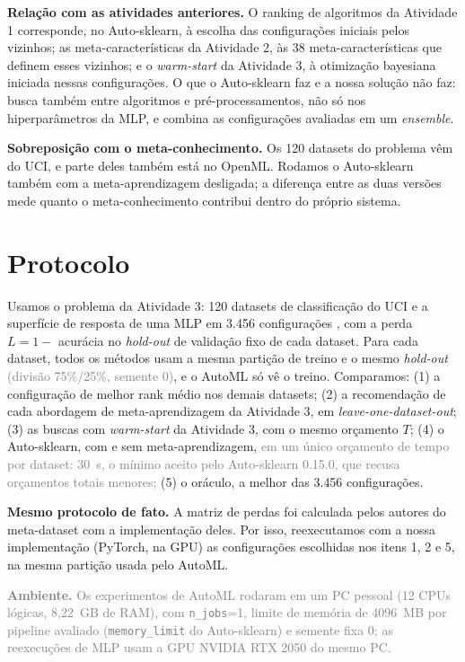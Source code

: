 \documentclass[10pt]{article}
\newcommand{\pend}[1]{}
\newcommand{\editinst}[1]{\textcolor{gray}{#1}}
\begin{document}
\textbf{Relação com as atividades anteriores.} O ranking de algoritmos da Atividade 1 corresponde, no Auto-sklearn, à escolha das configurações iniciais pelos vizinhos; as meta-características da Atividade 2, às 38 meta-características que definem esses vizinhos; e o \textit{warm-start} da Atividade 3, à otimização bayesiana iniciada nessas configurações. O que o Auto-sklearn faz e a nossa solução não faz: busca também entre algoritmos e pré-processamentos, não só nos hiperparâmetros da MLP, e combina as configurações avaliadas em um \textit{ensemble}.

\textbf{Sobreposição com o meta-conhecimento.} Os 120 datasets do problema vêm do UCI, e parte deles também está no OpenML. \pend{[Resultado do cruzamento entre os 120 datasets e os 208 da base do Auto-sklearn.]} Rodamos o Auto-sklearn também com a meta-aprendizagem desligada; a diferença entre as duas versões mede quanto o meta-conhecimento contribui dentro do próprio sistema.

\section{Protocolo}\label{sec:protocolo}

Usamos o problema da Atividade 3: 120 datasets de classificação do UCI e a superfície de resposta de uma MLP em 3.456 configurações \cite{Jomaa2021}, com a perda $L = 1-$ acurácia no \textit{hold-out} de validação fixo de cada dataset. Para cada dataset, todos os métodos usam a mesma partição de treino e o mesmo \textit{hold-out} \editinst{(divisão 75\%/25\%, semente 0)}, e o AutoML só vê o treino. Comparamos:
(1) a configuração de melhor rank médio nos demais datasets;
(2) a recomendação de cada abordagem de meta-aprendizagem da Atividade 3, em \textit{leave-one-dataset-out};
(3) as buscas com \textit{warm-start} da Atividade 3, com o mesmo orçamento $T$;
(4) o Auto-sklearn, com e sem meta-aprendizagem, \editinst{em um único orçamento de tempo por dataset: 30~s, o mínimo aceito pelo Auto-sklearn 0.15.0, que recusa orçamentos totais menores;}
(5) o oráculo, a melhor das 3.456 configurações.

\textbf{Mesmo protocolo de fato.} A matriz de perdas foi calculada pelos autores do meta-dataset com a implementação deles. Por isso, reexecutamos com a nossa implementação (PyTorch, na GPU) as configurações escolhidas nos itens 1, 2 e 5, na mesma partição usada pelo AutoML. \pend{[Correlação entre a perda reexecutada e a da matriz.]}

\editinst{\textbf{Ambiente.} Os experimentos de AutoML rodaram em um PC pessoal (12 CPUs lógicas, 8{,}22~GB de RAM), com \texttt{n\_jobs}=1, limite de memória de 4096~MB por pipeline avaliado (\texttt{memory\_limit} do Auto-sklearn) e semente fixa 0; as reexecuções de MLP usam a GPU NVIDIA RTX 2050 do mesmo PC.} \pend{[Modelo exato da CPU.]}
\end{document}
